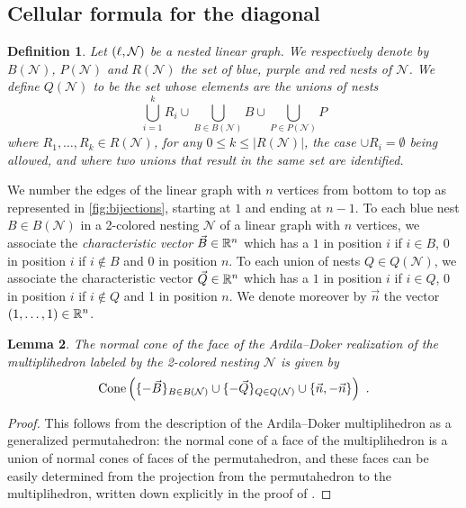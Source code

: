 \documentclass[10pt]{amsart}
\newtheorem{definition}{Definition}[section]
\newtheorem{lemma}[definition]{Lemma}
\theoremstyle{remark}
\begin{document}
\subsection{Cellular formula for the diagonal} \label{ss:cellular-formula}

\begin{definition}
Let $(\ell,\mathcal{N})$ be a nested linear graph. 
We respectively denote by $B(\mathcal{N})$, $P(\mathcal{N})$ and $R(\mathcal{N})$ the set of blue, purple and red nests of $\mathcal{N}$. 
We define $Q(\mathcal{N})$ to be the set whose elements are the unions of nests
\[   
\bigcup_{i=1}^k R_i \cup \bigcup_{B \in B(\mathcal{N})} B \cup 
  \bigcup_{P \in P(\mathcal{N})} P 
\]
where $R_1,\ldots,R_k \in R(\mathcal{N})$, for any $0 \leq k \leq |R(\mathcal{N})|$, the case $\cup R_i = \emptyset$ being allowed, and where two unions that result in the same set are identified.
\end{definition}

We number the edges of the linear graph with $n$ vertices from bottom to top as represented in \cref{fig:bijections}, starting at $1$ and ending at $n-1$.  
To each blue nest $B \in B(\mathcal{N})$ in a 2-colored nesting $\mathcal{N}$ of a linear graph with $n$ vertices, we associate the \emph{characteristic vector} $\vec B\in \mathbb{R}^n$ which has a $1$ in position $i$ if $i \in B$, $0$ in position $i$ if $i \notin B$ and 0 in position $n$.
To each union of nests $Q \in Q(\mathcal{N})$, we associate the characteristic vector $\vec Q \in \mathbb{R}^n$ which has a $1$ in position $i$ if $i \in Q$, $0$ in position $i$ if $i \notin Q$ and 1 in position $n$. 
We denote moreover by $\vec n$ the vector $(1,\ldots,1) \in \mathbb{R}^n$.

\begin{lemma} 
\label{lemma:normalcones}
The normal cone of the face of the Ardila--Doker realization of the multiplihedron labeled by the 2-colored nesting $\mathcal{N}$ is given by \[\operatorname{Cone}\left(\{-\vec B\}_{B \in B(\mathcal{N})} \cup \{-\vec Q\}_{Q \in Q(\mathcal{N})} \cup \{\vec n, - \vec n\} \right) \ . \]
\end{lemma} 

\begin{proof} 
This follows from the description of the Ardila--Doker multiplihedron as a generalized permutahedron: 
the normal cone of a face of the multiplihedron is a union of normal cones of faces of the permutahedron, and these faces can be easily determined from the projection from the permutahedron to the multiplihedron, written down explicitly in the proof of \cite[Theorem 3.3.6]{Doker11}.
\end{proof}
\end{document}
